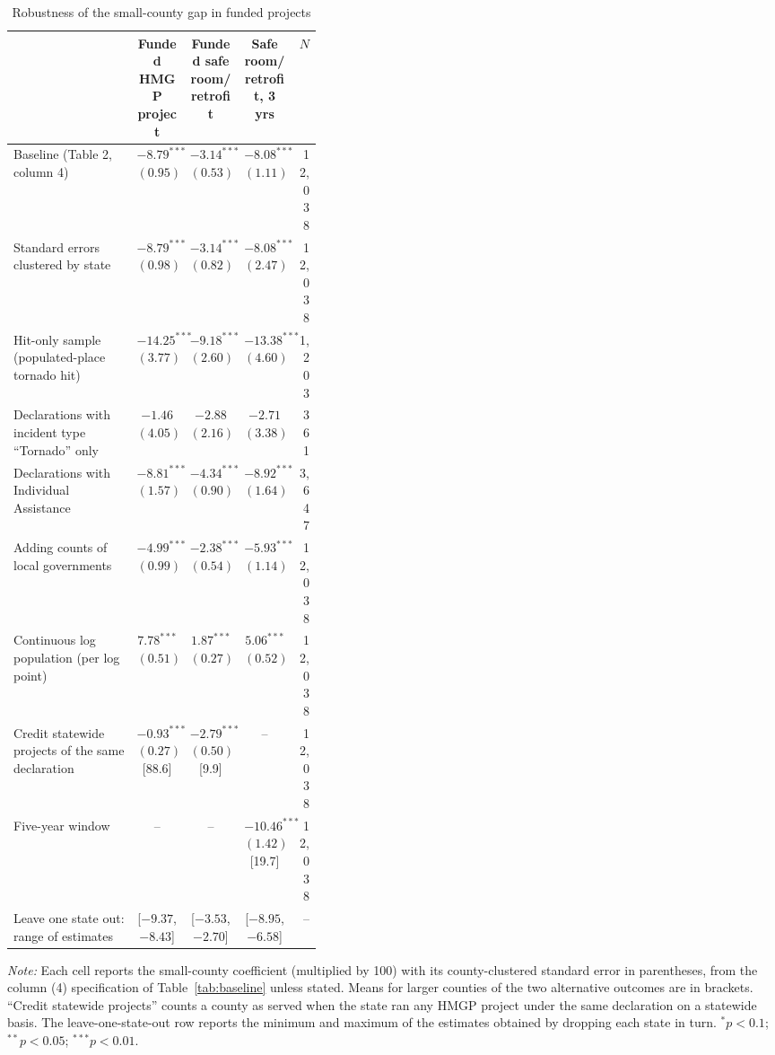\begin{table}[!htbp]
\centering
\caption{Robustness of the small-county gap in funded projects}
\label{tab:robust}
\footnotesize
\begin{adjustbox}{max width=\linewidth}
\begin{tabular}{@{}p{0.40\linewidth}cccr@{}}
\toprule
 & Funded HMGP project & Funded safe room/retrofit & Safe room/retrofit, 3 yrs & $N$ \\
\midrule
Baseline (Table 2, column 4) & $-8.79^{***}$ $(0.95)$ & $-3.14^{***}$ $(0.53)$ & $-8.08^{***}$ $(1.11)$ & 12,038 \\
Standard errors clustered by state & $-8.79^{***}$ $(0.98)$ & $-3.14^{***}$ $(0.82)$ & $-8.08^{***}$ $(2.47)$ & 12,038 \\
Hit-only sample (populated-place tornado hit) & $-14.25^{***}$ $(3.77)$ & $-9.18^{***}$ $(2.60)$ & $-13.38^{***}$ $(4.60)$ & 1,203 \\
Declarations with incident type ``Tornado'' only & $-1.46$ $(4.05)$ & $-2.88$ $(2.16)$ & $-2.71$ $(3.38)$ & 361 \\
Declarations with Individual Assistance & $-8.81^{***}$ $(1.57)$ & $-4.34^{***}$ $(0.90)$ & $-8.92^{***}$ $(1.64)$ & 3,647 \\
Adding counts of local governments & $-4.99^{***}$ $(0.99)$ & $-2.38^{***}$ $(0.54)$ & $-5.93^{***}$ $(1.14)$ & 12,038 \\
Continuous log population (per log point) & $7.78^{***}$ $(0.51)$ & $1.87^{***}$ $(0.27)$ & $5.06^{***}$ $(0.52)$ & 12,038 \\
Credit statewide projects of the same declaration & $-0.93^{***}$ $(0.27)$ [88.6] & $-2.79^{***}$ $(0.50)$ [9.9] & -- & 12,038 \\
Five-year window & -- & -- & $-10.46^{***}$ $(1.42)$ [19.7] & 12,038 \\
Leave one state out: range of estimates & [$-9.37$, $-8.43$] & [$-3.53$, $-2.70$] & [$-8.95$, $-6.58$] & -- \\
\bottomrule
\end{tabular}
\end{adjustbox}
\begin{minipage}{0.95\linewidth}\vspace{4pt}\scriptsize
\textit{Note:} Each cell reports the small-county coefficient (multiplied by 100) with its county-clustered standard error in parentheses, from the column (4) specification of Table~\ref{tab:baseline} unless stated. Means for larger counties of the two alternative outcomes are in brackets. ``Credit statewide projects'' counts a county as served when the state ran any HMGP project under the same declaration on a statewide basis. The leave-one-state-out row reports the minimum and maximum of the estimates obtained by dropping each state in turn. $^{*}p<0.1$; $^{**}p<0.05$; $^{***}p<0.01$.
\end{minipage}
\end{table}

